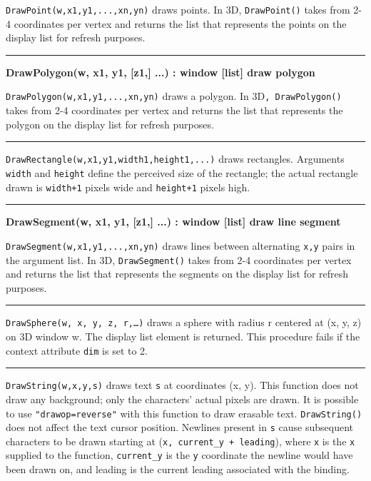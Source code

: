\noindent
\texttt{DrawPoint(w,x1,y1,...,xn,yn)} draws points. In 3D,
\texttt{DrawPoint()} takes from 2-4 coordinates per vertex and returns
the list that represents the points on the display list for refresh
purposes.

\bigskip\hrule\vspace{0.1cm}
\noindent
{\bf DrawPolygon(w, x1, y1, [z1,] ...) : window [list] \hfill draw polygon}

\noindent
\texttt{DrawPolygon(w,x1,y1,...,xn,yn)} draws a polygon. In 3D\texttt{,
DrawPolygon()} takes from 2-4 coordinates per vertex and returns the
list that represents the polygon on the display list for refresh
purposes.

\bigskip\hrule\vspace{0.1cm}

\noindent
\texttt{DrawRectangle(w,x1,y1,width1,height1,...)} draws rectangles.
Arguments \texttt{width} and \texttt{height} define the perceived size
of the rectangle; the actual rectangle drawn is \texttt{width+1} pixels
wide and \texttt{height+1} pixels high.

\bigskip\hrule\vspace{0.1cm}
\noindent
{\bf DrawSegment(w, x1, y1, [z1,] ...) : window [list] \hfill draw line segment}

\noindent
\texttt{DrawSegment(w,x1,y1,...,xn,yn)} draws lines between alternating
\texttt{x,y} pairs in the argument list. In 3D, \texttt{DrawSegment()}
takes from 2-4 coordinates per vertex and returns the list that
represents the segments on the display list for refresh purposes.

\bigskip\hrule\vspace{0.1cm}

\noindent
\texttt{DrawSphere(w, x, y, z, r,{\dots})} draws a sphere with radius
r centered at (x, y, z) on 3D window w. The display list element is
returned. This procedure fails if the context attribute \texttt{dim} is
set to 2.

\bigskip\hrule\vspace{0.1cm}

\noindent
\texttt{DrawString(w,x,y,s)} draws text \texttt{s} at coordinates (x,
y). This function does not draw any background; only the
characters' actual pixels are drawn. It is possible to
use \texttt{"drawop=reverse"} with this
function to draw erasable text. \texttt{DrawString()} does not affect
the text cursor position. Newlines present in \texttt{s} cause
subsequent characters to be drawn starting at (\texttt{x, current\_y +
leading}), where \texttt{x} is the \texttt{x} supplied to the function,
\texttt{current\_y} is the \texttt{y} coordinate the newline would have
been drawn on, and leading is the current leading associated with the
binding.

